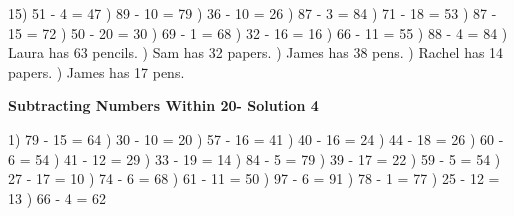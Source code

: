 \documentclass{article}%
\begin{document}
15) 51 {-} 4 = 47%
) 89 {-} 10 = 79%
) 36 {-} 10 = 26%
) 87 {-} 3 = 84%
) 71 {-} 18 = 53%
) 87 {-} 15 = 72%
) 50 {-} 20 = 30%
) 69 {-} 1 = 68%
) 32 {-} 16 = 16%
) 66 {-} 11 = 55%
) 88 {-} 4 = 84%
) Laura has 63 pencils.%
) Sam has 32 papers.%
) James has 38 pens.%
) Rachel has 14 papers.%
) James has 17 pens.%
\newline%
\newpage%
\large%
\begin{center}%
\textbf{Subtracting Numbers Within 20- Solution 4}%
\newline%
\end{center} \normalsize%
1) 79 {-} 15 = 64%
) 30 {-} 10 = 20%
) 57 {-} 16 = 41%
) 40 {-} 16 = 24%
) 44 {-} 18 = 26%
) 60 {-} 6 = 54%
) 41 {-} 12 = 29%
) 33 {-} 19 = 14%
) 84 {-} 5 = 79%
) 39 {-} 17 = 22%
) 59 {-} 5 = 54%
) 27 {-} 17 = 10%
) 74 {-} 6 = 68%
) 61 {-} 11 = 50%
) 97 {-} 6 = 91%
) 78 {-} 1 = 77%
) 25 {-} 12 = 13%
) 66 {-} 4 = 62%
\newline%
\end{document}

